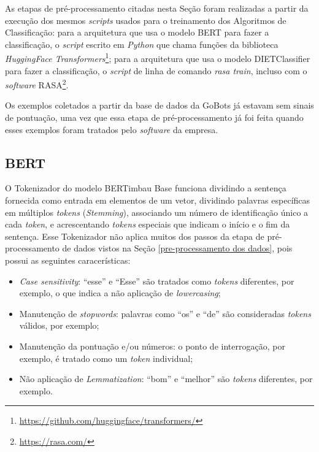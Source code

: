 As etapas de pré-processamento citadas nesta Seção foram realizadas a partir da execução dos mesmos \textit{scripts} usados para o treinamento dos Algoritmos de Classificação: para a arquitetura que usa o modelo BERT para fazer a classificação, o \textit{script} escrito em \textit{Python} que chama funções da biblioteca \textit{HuggingFace Transformers}\footnote{\url{https://github.com/huggingface/transformers/}}; para a arquitetura que usa o modelo DIETClassifier para fazer a classificação, o \textit{script} de linha de comando \textit{rasa train}, incluso com o \textit{software} RASA\footnote{\url{https://rasa.com/}}.

Os exemplos coletados a partir da base de dados da GoBots já estavam sem sinais de pontuação, uma vez que essa etapa de pré-processamento já foi feita quando esses exemplos foram tratados pelo \textit{software} da empresa.

\subsection{BERT}
\label{prepro_bert}
O Tokenizador do modelo BERTimbau Base funciona dividindo a sentença fornecida como entrada em elementos de um vetor, dividindo palavras específicas em múltiplos \textit{tokens} (\textit{Stemming}), associando um número de identificação único a cada \textit{token}, e acrescentando \textit{tokens} especiais que indicam o início e o fim da sentença. Esse Tokenizador não aplica muitos dos passos da etapa de pré-processamento de dados vistos na Seção \ref{pre-processamento dos dados}, pois possui as seguintes caracerísticas:
\begin{itemize}
    \item \textit{Case sensitivity}: ``esse'' e ``Esse'' são tratados como \textit{tokens} diferentes, por exemplo, o que indica a não aplicação de \textit{lowercasing};
    \item Manutenção de \textit{stopwords}: palavras como ``os'' e ``de'' são consideradas \textit{tokens} válidos, por exemplo;
    \item Manutenção da pontuação e/ou números: o ponto de interrogação, por exemplo, é tratado como um \textit{token} individual;
    \item Não aplicação de \textit{Lemmatization}: ``bom'' e ``melhor'' são \textit{tokens} diferentes, por exemplo.
\end{itemize}

